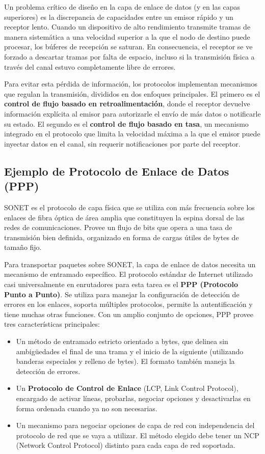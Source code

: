 Un problema crítico de diseño en la capa de enlace de datos (y en las capas superiores) es la discrepancia de capacidades entre un emisor rápido y un receptor lento. Cuando un dispositivo de alto rendimiento transmite tramas de manera sistemática a una velocidad superior a la que el nodo de destino puede procesar, los búferes de recepción se saturan. En consecuencia, el receptor se ve forzado a descartar tramas por falta de espacio, incluso si la transmisión física a través del canal estuvo completamente libre de errores. 

Para evitar esta pérdida de información, los protocolos implementan mecanismos que regulan la transmisión, divididos en dos enfoques principales. El primero es el \textbf{control de flujo basado en retroalimentación}, donde el receptor devuelve información explícita al emisor para autorizarle el envío de más datos o notificarle su estado. El segundo es el \textbf{control de flujo basado en tasa}, un mecanismo integrado en el protocolo que limita la velocidad máxima a la que el emisor puede inyectar datos en el canal, sin requerir notificaciones por parte del receptor.

\subsection{Ejemplo de Protocolo de Enlace de Datos (PPP)}

SONET es el protocolo de capa física que se utiliza con más frecuencia sobre los enlaces de fibra óptica de área amplia que constituyen la espina dorsal de las redes de comunicaciones. Provee un flujo de bits que opera a una tasa de transmisión bien definida, organizado en forma de cargas
útiles de bytes de tamaño fijo. 

Para transportar paquetes sobre SONET, la capa de enlace de datos necesita un mecanismo de entramado específico. El protocolo estándar de Internet utilizado casi universalmente en enrutadores para esta tarea es el \textbf{PPP (Protocolo Punto a Punto)}. Se utiliza para manejar la configuración de detección de errores en los enlaces, soporta múltiples protocolos, permite la autentificación y tiene muchas otras funciones. Con un amplio conjunto de opciones, PPP provee tres características principales:

\begin{itemize}
  \item Un método de entramado estricto orientado a bytes, que delinea sin ambigüedades el final de una trama y el inicio de la siguiente (utilizando banderas especiales y relleno de bytes). El formato también maneja la detección de errores.
  \item Un \textbf{Protocolo de Control de Enlace} (LCP, Link Control Protocol), encargado de activar líneas, probarlas, negociar opciones y desactivarlas en forma ordenada cuando ya no son necesarias.
  \item Un mecanismo para negociar opciones de capa de red con independencia del protocolo de red que se vaya a utilizar. El método elegido debe tener un NCP (Network Control Protocol) distinto para cada capa de red soportada.
\end{itemize}

